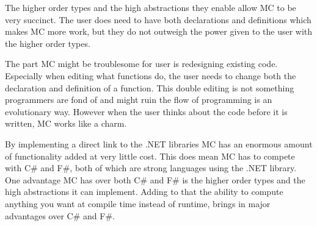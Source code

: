 The higher order types and the high abstractions they enable allow MC to be very succinct.
The user does need to have both declarations and definitions which makes MC more work, but they do not outweigh the power given to the user with the higher order types.

The part MC might be troublesome for user is redesigning existing code.
Especially when editing what functions do, the user needs to change both the declaration and definition of a function.
This double editing is not something programmers are fond of and might ruin the flow of programming is an evolutionary way.
However when the user thinks about the code before it is written, MC works like a charm.

By implementing a direct link to the .NET libraries MC has an enormous amount of functionality added at very little cost.
This does mean MC has to compete with C\# and F\#, both of which are strong languages using the .NET library.
One advantage MC has over both C\# and F\# is the higher order types and the high abstractions it can implement.
Adding to that the ability to compute anything you want at compile time instead of runtime, brings in major advantages over C\# and F\#.


